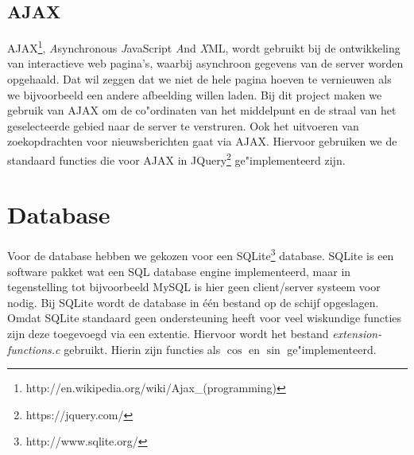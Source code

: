 \documentclass[twoside,openright]{uva-bachelor-thesis}
\begin{document}
		\subsection{AJAX}
			AJAX\footnote{http://en.wikipedia.org/wiki/Ajax\_(programming)}, \textit{A}synchronous \textit{J}avaScript \textit{A}nd \textit{X}ML, wordt gebruikt bij de ontwikkeling van interactieve web pagina's, waarbij asynchroon gegevens van de server worden opgehaald. Dat wil zeggen dat we niet de hele pagina hoeven te vernieuwen als we bijvoorbeeld een andere afbeelding willen laden. Bij dit project maken we gebruik van AJAX om de co"ordinaten van het middelpunt en de straal van het geselecteerde gebied naar de server te verstruren. Ook het uitvoeren van zoekopdrachten voor nieuwsberichten gaat via AJAX. Hiervoor gebruiken we de standaard functies die voor AJAX in JQuery\footnote{https://jquery.com/} ge"implementeerd zijn.
	\section{Database}
		\label{sec:db}
		Voor de database hebben we gekozen voor een SQLite\footnote{http://www.sqlite.org/} database. SQLite is een software pakket wat een SQL database engine implementeerd, maar in tegenstelling tot bijvoorbeeld MySQL is hier geen client/server systeem voor nodig. Bij SQLite wordt de database in \'e\'en bestand op de schijf opgeslagen.
		\\[0.5cm]
		Omdat SQLite standaard geen ondersteuning heeft voor veel wiskundige functies zijn deze toegevoegd via een extentie. Hiervoor wordt het bestand \textit{extension-functions.c} gebruikt. Hierin zijn functies als $\cos$ en $\sin$ ge"implementeerd.
\end{document}
